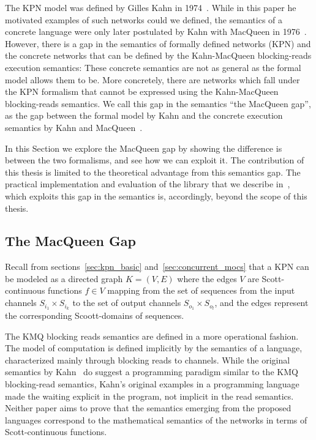 The \ac{KPN} model was defined by Gilles Kahn in 1974~\cite{kahn74}.
While in this paper he motivated examples of such networks could we defined, the
semantics of a concrete language were only later postulated by Kahn with MacQueen
in 1976~\cite{kahn_macqueen}.
However, there is a gap in the semantics of formally defined networks (\ac{KPN})
and the concrete networks that can be defined by the Kahn-MacQueen
blocking-reads execution semantics: These concrete semantics are not as general
as the formal model allows them to be.
More concretely, there are networks which fall under the \ac{KPN} formalism
that cannot be expressed using the Kahn-MacQueen blocking-reads semantics.
We call this gap in the semantics ``the MacQueen gap'', as the gap between the formal model by Kahn and the concrete execution semantics by Kahn and MacQueen~\cite{lee_matsikoudis_semantics,khasanov_parmaditam18}. 

In this Section we explore the MacQueen gap by showing the difference is between the two formalisms, and see how we can exploit it.
The contribution of this thesis is limited to the theoretical advantage from this semantics gap.
The practical implementation and evaluation of the library that we describe in~\cite{khasanov_parmaditam18}, which exploits this gap in the semantics is, accordingly, beyond the scope of this thesis. 

\subsection{The MacQueen Gap}

Recall from sections~\ref{sec:kpn_basic} and~\ref{sec:concurrent_mocs} that a \ac{KPN} can be modeled as a directed graph $K = (V,E)$ where the edges $V$ are Scott-continuous functions $f \in V$ mapping from the set of sequences from the input channels $S_{i_1} \times S_{i_k}$ to the set of output channels $S_{o_1} \times S_{o_l}$, and the edges represent the corresponding Scoott-domains of sequences.

The \acf{KMQ} blocking reads semantics are defined in a more operational fashion.
The model of computation is defined implicitly by the semantics of a language\cite{kahn_macqueen}, characterized mainly through blocking reads to channels.
While the original semantics by Kahn~\cite{kahn74} do suggest a programming paradigm similar to the \ac{KMQ} blocking-read semantics, Kahn's original examples in a programming language made the waiting explicit in the program, not implicit in the read semantics.
Neither paper aims to prove that the semantics emerging from the proposed languages correspond to the mathematical semantics of the networks in terms of Scott-continuous functions.

